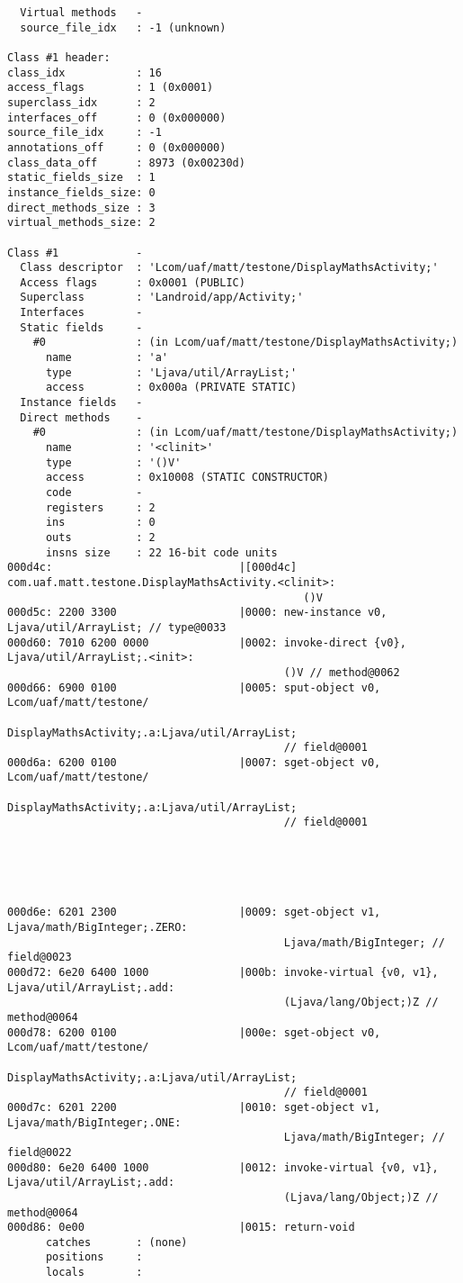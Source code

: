 \begin{lstlisting}
  Virtual methods   -
  source_file_idx   : -1 (unknown)

Class #1 header:
class_idx           : 16
access_flags        : 1 (0x0001)
superclass_idx      : 2
interfaces_off      : 0 (0x000000)
source_file_idx     : -1
annotations_off     : 0 (0x000000)
class_data_off      : 8973 (0x00230d)
static_fields_size  : 1
instance_fields_size: 0
direct_methods_size : 3
virtual_methods_size: 2

Class #1            -
  Class descriptor  : 'Lcom/uaf/matt/testone/DisplayMathsActivity;'
  Access flags      : 0x0001 (PUBLIC)
  Superclass        : 'Landroid/app/Activity;'
  Interfaces        -
  Static fields     -
    #0              : (in Lcom/uaf/matt/testone/DisplayMathsActivity;)
      name          : 'a'
      type          : 'Ljava/util/ArrayList;'
      access        : 0x000a (PRIVATE STATIC)
  Instance fields   -
  Direct methods    -
    #0              : (in Lcom/uaf/matt/testone/DisplayMathsActivity;)
      name          : '<clinit>'
      type          : '()V'
      access        : 0x10008 (STATIC CONSTRUCTOR)
      code          -
      registers     : 2
      ins           : 0
      outs          : 2
      insns size    : 22 16-bit code units
000d4c:                             |[000d4c] com.uaf.matt.testone.DisplayMathsActivity.<clinit>:
                                              ()V
000d5c: 2200 3300                   |0000: new-instance v0, Ljava/util/ArrayList; // type@0033
000d60: 7010 6200 0000              |0002: invoke-direct {v0}, Ljava/util/ArrayList;.<init>:
                                           ()V // method@0062
000d66: 6900 0100                   |0005: sput-object v0, Lcom/uaf/matt/testone/
                                           DisplayMathsActivity;.a:Ljava/util/ArrayList;
                                           // field@0001
000d6a: 6200 0100                   |0007: sget-object v0, Lcom/uaf/matt/testone/
                                           DisplayMathsActivity;.a:Ljava/util/ArrayList;
                                           // field@0001





000d6e: 6201 2300                   |0009: sget-object v1, Ljava/math/BigInteger;.ZERO:
                                           Ljava/math/BigInteger; // field@0023
000d72: 6e20 6400 1000              |000b: invoke-virtual {v0, v1}, Ljava/util/ArrayList;.add:
                                           (Ljava/lang/Object;)Z // method@0064
000d78: 6200 0100                   |000e: sget-object v0, Lcom/uaf/matt/testone/
                                           DisplayMathsActivity;.a:Ljava/util/ArrayList;
                                           // field@0001
000d7c: 6201 2200                   |0010: sget-object v1, Ljava/math/BigInteger;.ONE:
                                           Ljava/math/BigInteger; // field@0022
000d80: 6e20 6400 1000              |0012: invoke-virtual {v0, v1}, Ljava/util/ArrayList;.add:
                                           (Ljava/lang/Object;)Z // method@0064
000d86: 0e00                        |0015: return-void
      catches       : (none)
      positions     :
      locals        :


\end{lstlisting}
